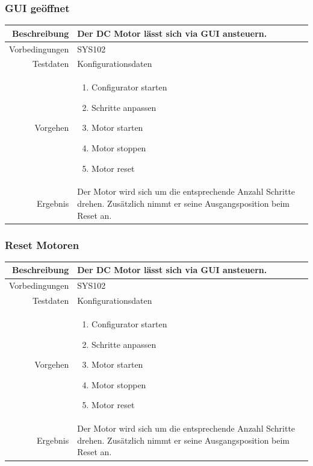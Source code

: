 \subsubsection{GUI geöffnet}
\begin{table}[h!]
	\renewcommand{\arraystretch}{1.5}
	\begin{tabular}{|r|p{14cm}|}
		\hline Beschreibung & Der DC Motor lässt sich via GUI ansteuern. \\ 
		\hline Vorbedingungen & SYS102 \\ 
		\hline Testdaten & Konfigurationsdaten \\ 
		\hline Vorgehen & 
		\begin{enumerate}
			\item Configurator starten
			\item Schritte anpassen
			\item Motor starten
			\item Motor stoppen
			\item Motor reset
		\end{enumerate} \\ 
		\hline Ergebnis & Der Motor wird sich um die entsprechende Anzahl Schritte drehen. Zusätzlich nimmt er seine Ausgangsposition beim Reset an. \\ 
		\hline 
	\end{tabular}
\end{table}

\subsubsection{Reset Motoren}
\begin{table}[h!]
	\renewcommand{\arraystretch}{1.5}
	\begin{tabular}{|r|p{14cm}|}
		\hline Beschreibung & Der DC Motor lässt sich via GUI ansteuern. \\ 
		\hline Vorbedingungen & SYS102 \\ 
		\hline Testdaten & Konfigurationsdaten \\ 
		\hline Vorgehen & 
		\begin{enumerate}
			\item Configurator starten
			\item Schritte anpassen
			\item Motor starten
			\item Motor stoppen
			\item Motor reset
		\end{enumerate} \\ 
		\hline Ergebnis & Der Motor wird sich um die entsprechende Anzahl Schritte drehen. Zusätzlich nimmt er seine Ausgangsposition beim Reset an. \\ 
		\hline 
	\end{tabular}
\end{table}

